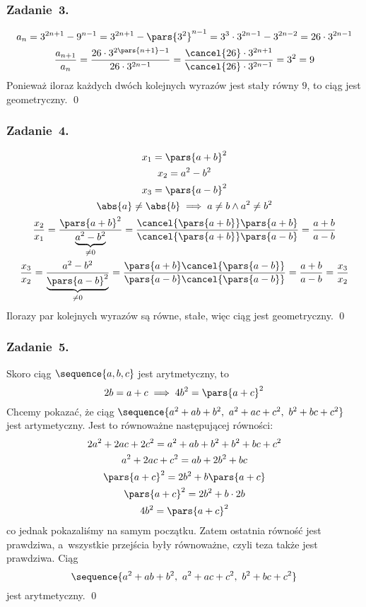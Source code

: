\subsubsection*{Zadanie~3.}
\begin{gather*}
    a_n = 3^{2n + 1} - 9^{n - 1}
        = 3^{2n + 1} - \pars{3^2}^{n - 1}
        = 3^3 \cdot 3^{2n - 1} - 3^{2n - 2}
        = 26 \cdot 3^{2n - 1}\\
    \frac{a_{n + 1}}{a_n}
        = \frac{26 \cdot 3^{2\pars{n + 1} - 1}}{26 \cdot 3^{2n - 1}}
        = \frac{\cancel{26} \cdot 3^{2n + 1}}{\cancel{26} \cdot 3^{2n - 1}}
        = 3^2
        = 9
\end{gather*}
Ponieważ iloraz każdych dwóch kolejnych wyrazów jest stały równy \(9\), to ciąg jest geometryczny.
\qed
\subsubsection*{Zadanie~4.}
\begin{gather*}
    x_1 = \pars{a + b}^2\\
    x_2 = a^2 - b^2\\
    x_3 = \pars{a - b}^2\\
    \abs{a} \neq \abs{b} \implies a \neq b \land a^2 \neq b^2\\
    \frac{x_2}{x_1}
        = \frac{\pars{a + b}^2}{\underbrace{a^2 - b^2}_{\neq 0}}
        = \frac{\cancel{\pars{a + b}}\pars{a + b}}{\cancel{\pars{a + b}}\pars{a - b}}
        = \frac{a + b}{a - b}\\
    \frac{x_3}{x_2}
        = \frac{a^2 - b^2}{\underbrace{\pars{a - b}^2}_{\neq 0}}
        = \frac{\pars{a + b}\cancel{\pars{a - b}}}{\pars{a - b}\cancel{\pars{a - b}}}
        = \frac{a + b}{a - b} = \frac{x_3}{x_2}
\end{gather*}
Ilorazy par kolejnych wyrazów są równe, stałe, więc ciąg jest geometryczny.
\qed
\subsubsection*{Zadanie~5.}
Skoro ciąg \(\sequence{a, b, c}\) jest arytmetyczny, to
\begin{equation*}
    2b = a + c \implies 4b^2 = \pars{a + c}^2
\end{equation*}
Chcemy pokazać, że ciąg \(\sequence{a^2 + ab + b^2,\ a^2 + ac + c^2,\ b^2 + bc + c^2}\) jest artymetyczny. Jest to równoważne następującej równości:
\begin{gather*}
    2a^2 + 2ac + 2c^2 = a^2 + ab + b^2 + b^2 + bc + c^2\\
    a^2 + 2ac + c^2 = ab + 2b^2 + bc\\
    \pars{a + c}^2 = 2b^2 + b\pars{a + c}\\
    \pars{a + c}^2 = 2b^2 + b \cdot 2b\\
    4b^2 = \pars{a + c}^2
\end{gather*}
co jednak pokazaliśmy na samym początku. Zatem ostatnia równość jest prawdziwa, a~wszystkie przejścia były równoważne, czyli teza także jest prawdziwa. Ciąg
\begin{equation*}
    \sequence{a^2 + ab + b^2,\ a^2 + ac + c^2,\ b^2 + bc + c^2}
\end{equation*}
jest arytmetyczny.
\qed
